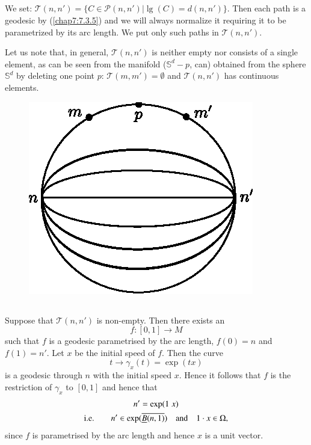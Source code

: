 \subsection{}\label{chap7:defi7.4.1}

\begin{defi*}
We set:
$\mathscr{T}(n,n')=\{C\in\mathscr{P}(n,n')|\lg(C)=d(n,n')\}$. Then
each path is a geodesic by (\ref{chap7:7.3.5}) and we will always
normalize it requiring it to be parametrized by its arc length. We put
only such paths in $\mathscr{T}(n,n')$. 
\end{defi*}

Let us note that, in general, $\mathscr{T}(n,n')$ is neither empty nor
consists of a single element, as can be seen from the manifold
($\mathbb{S}^{d}-p$, can) obtained from the sphere $\mathbb{S}^d$ by
deleting one point $p$: $\mathscr{T}(m,m')=\emptyset$ and
$\mathscr{T}(n,n')$ has continuous elements.
\begin{figure}[H]
\centering
\includegraphics{figures/chap7-fig6.eps}
\end{figure}

\setcounter{subsection}{1}
\subsection{}\label{chap7:7.4.2}\pageoriginale

Suppose that $\mathscr{T}(n,n')$ is non-empty. Then there exists an
$$
f:[0,1]\to M
$$
such that $f$ is a geodesic parametrised by the arc length, $f(0)=n$
and $f(1)=n'$. Let $x$ be the initial speed of $f$. Then the curve
$$
t\to \gamma_{x}(t)=\exp(tx)
$$
is a geodesic through $n$ with the initial speed $x$. Hence it follows
that $f$ is the restriction of $\gamma_{x}$ to $[0,1]$ and hence that
\begin{gather*}
n'=\exp(1\;x)\\
\text{i.e.}\qquad
n'\in\exp(\overline{\underline{B}(n,1)})\quad\text{and}\quad 1\cdot x\in\Omega,
\end{gather*}
since $f$ is parametrised by the arc length and hence $x$ is a unit
vector.

